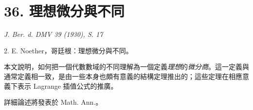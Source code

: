 \documentclass[11pt]{article}
\begin{document}
\setcounter{footnote}{0}

\section*{36. 理想微分與不同}

\begin{center}
\emph{J. Ber. d. DMV 39 (1930), S. 17}
\end{center}

2. E. Noether，哥廷根：理想微分與不同。

本文說明，如何把一個代數數域的不同理解為一個定義\emph{理想}的\emph{微分商}。這一定義與通常定義相一致，是由一些本身也頗有意義的結構定理推出的；這些定理在相應意義下表示 Lagrange 插值公式的推廣。

詳細論述將發表於 Math. Ann.。

\clearpage
\setcounter{footnote}{0}
\end{document}
